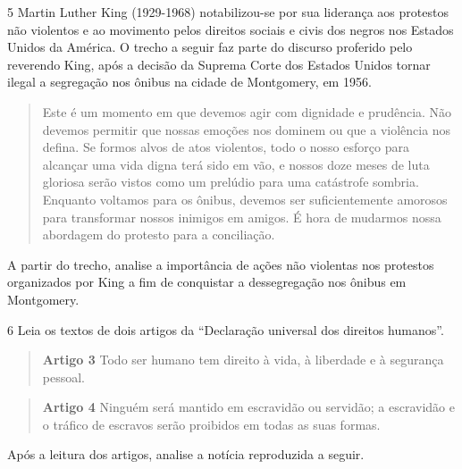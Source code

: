 
\num{5} Martin Luther King (1929-1968) notabilizou-se por sua liderança
aos protestos não violentos e ao movimento pelos direitos sociais e
civis dos negros nos Estados Unidos da América. O trecho a seguir faz
parte do discurso proferido pelo reverendo King, após a decisão da
Suprema Corte dos Estados Unidos tornar ilegal a segregação nos ônibus
na cidade de Montgomery, em 1956.

\begin{quote}
Este é um momento em que devemos agir com dignidade e prudência. Não
devemos permitir que nossas emoções nos dominem ou que a violência nos
defina. Se formos alvos de atos violentos, todo o nosso esforço para
alcançar uma vida digna terá sido em vão, e nossos doze meses de luta
gloriosa serão vistos como um prelúdio para uma catástrofe sombria.
Enquanto voltamos para os ônibus, devemos ser suficientemente amorosos
para transformar nossos inimigos em amigos. É hora de mudarmos nossa
abordagem do protesto para a conciliação.
\end{quote}

A partir do trecho, analise a importância de ações não violentas nos
protestos organizados por King a fim de conquistar a dessegregação nos
ônibus em Montgomery.


\num{6} Leia os textos de dois artigos da ``Declaração universal dos
direitos humanos''.

\begin{quote}
\textbf{Artigo 3} Todo ser humano tem direito à vida, à liberdade e à
segurança pessoal.
\end{quote}

\begin{quote}
\textbf{Artigo 4} Ninguém será mantido em escravidão ou servidão; a
escravidão e o tráfico de escravos serão proibidos em todas as suas
formas.
\end{quote}

Após a leitura dos artigos, analise a notícia reproduzida a seguir.

